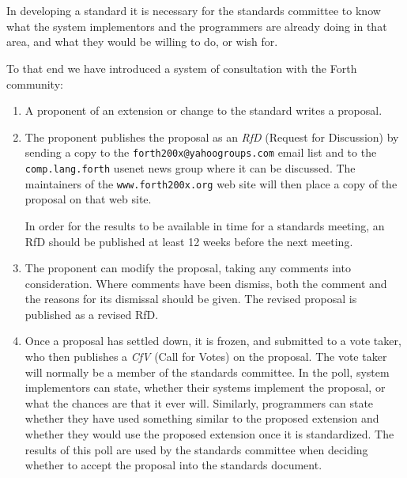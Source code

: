 \chapter*{}
\label{process}

\cbstart
{}
In developing a standard it is necessary for the standards committee to
know what the system implementors and the programmers are already doing
in that area, and what they would be willing to do, or wish for.

To that end we have introduced a system of consultation with the Forth
community:

\begin{enumerate}
\item
	A proponent of an extension or change to the standard writes a
	proposal.

\item
	The proponent publishes the proposal as an \emph{RfD} (Request for
	Discussion) by sending a copy to the \texttt{forth200x@yahoogroups.com}
	email list and to the \texttt{comp.lang.forth} usenet news group
	where it can be discussed.  The maintainers of the
	\texttt{www.forth200x.org} web site will then place a copy of the
	proposal on that web site.

	In order for the results to be available in time for a standards
	meeting, an RfD should be published at least 12 weeks before the
	next meeting.

\item
	The proponent can modify the proposal, taking any comments into
	consideration.  Where comments have been dismiss, both the comment
	and the reasons for its dismissal should be given.  The revised
	proposal is published as a revised RfD.

\item
	Once a proposal has settled down, it is frozen, and submitted to a
	vote taker, who then publishes a \emph{CfV} (Call for Votes) on the
	proposal. The vote taker will normally be a member of the standards
	committee.  In the poll, system implementors can state, whether
	their systems implement the proposal, or what the chances are that
	it ever will.  Similarly, programmers can state whether they have
	used something similar to the proposed extension and whether they
	would use the proposed extension once it is standardized.  The
	results of this poll are used by the standards committee when
	deciding whether to accept the proposal into the standards document.


\end{enumerate}
